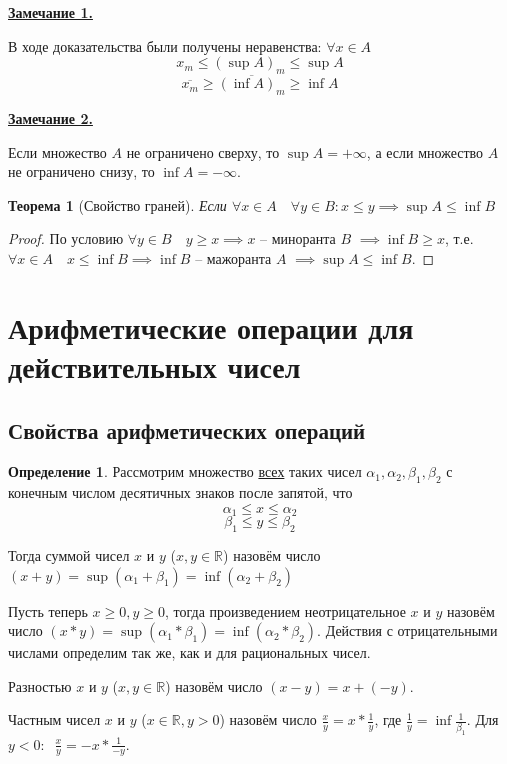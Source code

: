 \documentclass[a4paper,oneside]{article}
\newcommand{\parspace}{\vspace{10pt}}
\newtheorem{theorem}{Теорема}[subsection]
\theoremstyle{definition}
\newtheorem{definition}{Определение}[subsection]
\theoremstyle{definition}
\theoremstyle{definition}
\begin{document}
\underline{\textbf{Замечание 1.}}

В ходе доказательства были получены неравенства: $\forall x \in A$
\[x_m \le (\sup A)_m \le \sup A\]
\[\overline{x_m} \ge \overline{(\inf A)_m} \ge \inf A\]

\parspace

\underline{\textbf{Замечание 2.}}

Если множество $A$ не ограничено сверху, то $\sup A = + \infty$, а если множество $A$
не ограничено снизу, то $\inf A = - \infty$.

\parspace

\begin{theorem}[Свойство граней]
    Если $\forall x \in A \quad \forall y \in B: x \le y \implies \sup A \le \inf B$
\end{theorem}

\begin{proof}
    По условию $\forall y \in B \quad y \ge x \implies x$ -- миноранта $B$
    $\implies \inf B \ge x$, т.е. $\forall x \in A \quad x \le \inf B \implies \inf B$ --
    мажоранта $A$ $\implies \sup A \le \inf B$.
\end{proof}

\section{Арифметические операции для действительных чисел}

\subsection{Свойства арифметических операций}

\begin{definition}
    Рассмотрим множество \underline{всех} таких чисел
    $\alpha_1, \alpha_2, \beta_1, \beta_2$ с конечным числом десятичных знаков
    после запятой, что
    \[\alpha_1 \le x \le \alpha_2\]
    \[\beta_1 \le y \le \beta_2\]

    Тогда суммой чисел $x$ и $y$ ($x, y \in \mathbb{R}$) назовём число 
    $(x + y) = \sup (\alpha_1 + \beta_1) = \inf (\alpha_2 + \beta_2)$

    Пусть теперь $x \ge 0, y \ge 0$, тогда произведением неотрицательное $x$ и $y$
    назовём число $(x * y) = \sup (\alpha_1 * \beta_1) = \inf (\alpha_2 * \beta_2)$.
    Действия с отрицательными числами определим так же, как и для рациональных чисел.

    Разностью $x$ и $y$ ($x, y \in \mathbb{R}$) назовём число $(x - y) = x + (-y)$.

    Частным чисел $x$ и $y$ ($x \in \mathbb{R}, y > 0$) назовём число 
    $\frac{x}{y} = x * \frac{1}{y}$, где $\frac{1}{y} = \inf \frac{1}{\beta_1}$.
    Для $y < 0: \:$ $\frac{x}{y} = -x * \frac{1}{-y}$.
\end{definition}
\end{document}
